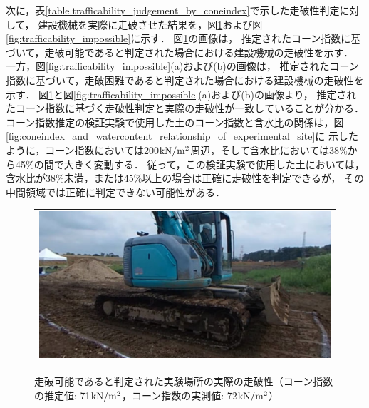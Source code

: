 次に，表\ref{table.trafficability_judgement_by_coneindex}で示した走破性判定に対して，
建設機械を実際に走破させた結果を，図\ref{fig:validationsoil_trafficability_possible_coneindex_461_233}および図\ref{fig:trafficability_impossible}に示す．
図\ref{fig:validationsoil_trafficability_possible_coneindex_461_233}の画像は，
推定されたコーン指数に基づいて，走破可能であると判定された場合における建設機械の走破性を示す．
一方，図\ref{fig:trafficability_impossible}(a)および(b)の画像は，
推定されたコーン指数に基づいて，走破困難であると判定された場合における建設機械の走破性を示す．
図\ref{fig:validationsoil_trafficability_possible_coneindex_461_233}と図\ref{fig:trafficability_impossible}(a)および(b)の画像より，
推定されたコーン指数に基づく走破性判定と実際の走破性が一致していることが分かる．
コーン指数推定の検証実験で使用した土のコーン指数と含水比の関係は，図\ref{fig:coneindex_and_watercontent_relationship_of_experimental_site}に
示したように，コーン指数においては200${\rm kN/m^2}$周辺，そして含水比においては38$\%$から45$\%$の間で大きく変動する．
従って，この検証実験で使用した土においては，含水比が38$\%$未満，または45$\%$以上の場合は正確に走破性を判定できるが，
その中間領域では正確に判定できない可能性がある．

\begin{figure}[b]
      \begin{center}
            \begin{tabular}{c}

            \begin{minipage}[b]{\linewidth}
            \centering
            \includegraphics[width=12cm]{./ch5_ConeIndexEstimation/Fig/trafficability_coneindex_461_233_compressed.pdf}
            \setlength{\captionmargin}{50pt} %
            \caption{走破可能であると判定された実験場所の実際の走破性\protect\linebreak（コーン指数の推定値: 71${\rm kN/m^2}$，コーン指数の実測値: 72${\rm kN/m^2}$）}
            \label{fig:validationsoil_trafficability_possible_coneindex_461_233}
            \vspace{3cm}
            \end{minipage}

            \end{tabular}
      \end{center}
\end{figure}

